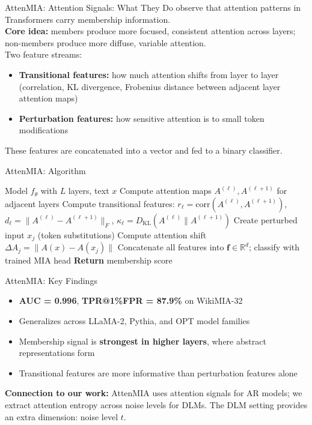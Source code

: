 \documentclass[10pt, aspectratio=169]{beamer}
\newcommand{\KL}{D_{\mathrm{KL}}}
\begin{document}

\begin{frame}{AttenMIA: Attention Signals: What They Do}
  \citet{zaree2026attenmia} observe that attention patterns in Transformers carry membership information.\\[8pt]
  \textbf{Core idea:} members produce more focused, consistent attention across layers;
  non-members produce more diffuse, variable attention.\\[8pt]
  Two feature streams:
  \begin{itemize}
    \item \textbf{Transitional features:} how much attention shifts from layer to layer (correlation, KL divergence, Frobenius distance between adjacent layer attention maps)
    \item \textbf{Perturbation features:} how sensitive attention is to small token modifications
  \end{itemize}
  These features are concatenated into a vector and fed to a binary classifier.
\end{frame}

\begin{frame}{AttenMIA: Algorithm}
  \begin{algorithmic}[1]
    \Require Model $f_\theta$ with $L$ layers, text $x$
      \State Compute attention maps $A^{(\ell)}, A^{(\ell+1)}$ for adjacent layers
      \State Compute transitional features:
        $r_\ell = \mathrm{corr}(A^{(\ell)}, A^{(\ell+1)})$,
        $d_\ell = \|A^{(\ell)} - A^{(\ell+1)}\|_F$,
        $\kappa_\ell = \KL(A^{(\ell)} \| A^{(\ell+1)})$
    \EndFor
      \State Create perturbed input $x_j$ (token substitutions)
      \State Compute attention shift $\Delta A_j = \|A(x) - A(x_j)\|$
    \EndFor
    \State Concatenate all features into $\mathbf{f} \in \mathbb{R}^d$; classify with trained MIA head
    \State \textbf{Return} membership score
  \end{algorithmic}
\end{frame}

\begin{frame}{AttenMIA: Key Findings}
  \begin{itemize}
    \item \textbf{AUC = 0.996}, \textbf{TPR@1\%FPR = 87.9\%} on WikiMIA-32
    \item Generalizes across LLaMA-2, Pythia, and OPT model families
    \item Membership signal is \textbf{strongest in higher layers}, where abstract representations form
    \item Transitional features are more informative than perturbation features alone
  \end{itemize}
  \vspace{8pt}
  \textbf{Connection to our work:} AttenMIA uses attention signals for AR models; we extract attention entropy across noise levels for DLMs. The DLM setting provides an extra dimension: noise level $t$.
\end{frame}
\end{document}
